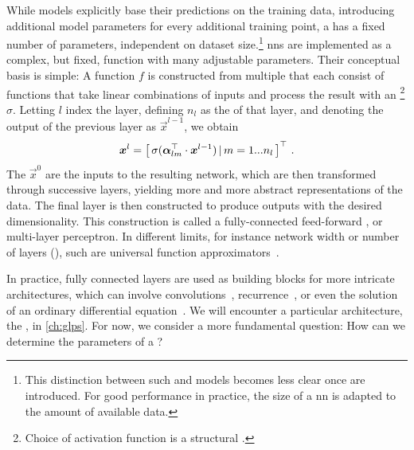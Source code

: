 While \krr models explicitly base their predictions on the training data, introducing additional model parameters for every additional training point, a  has a fixed number of parameters, independent on dataset size.\footnote[][-0.5\baselineskip]{
	This distinction between such  and  models becomes less clear once \hps are introduced. For good performance in practice, the size of a \gls{nn} is adapted to the amount of available data.
} \Glspl{nn} are implemented as a complex, but fixed, function with many adjustable parameters.
Their conceptual basis is simple: A function $f$ is constructed from multiple  that each consist of functions that take linear combinations of inputs and process the result with an \footnote{Choice of activation function is a structural \hp.} $\sigma$.
Letting $l$ index the layer, defining $n_l$ as the  of that layer, and denoting the output of the previous layer as $\vec{x}^{l-1}$, we obtain
\begin{align}
	\boldsymbol{x}^l = \left[\, \sigma(\boldsymbol{\alpha}_{lm}^\top \cdot \boldsymbol{x}^{l-1})\, |\, m=1...n_l \, \right]^\top \, .	
\end{align}
The $\vec{x}^0$ are the inputs to the resulting network, which are then transformed through successive layers, yielding more and more abstract representations of the data. The final layer is then constructed to produce outputs with the desired dimensionality. This construction is called a fully-connected feed-forward \nn, or multi-layer perceptron.
In different limits, for instance network width or number of layers (), such \nns are universal function approximators~\cite{c1989m,g2003m}.

In practice, fully connected layers are used as building blocks for more intricate architectures, which can involve convolutions~\cite{lbhj1989m,ksh2012m}, recurrence~\cite{hs1997m}, or even the solution of an ordinary differential equation~\cite{crbd2018m}. We will encounter a particular architecture, the \mpnn, in \cref{ch:glps}. For now, we consider a more fundamental question: How can we determine the parameters of a \nn? 

